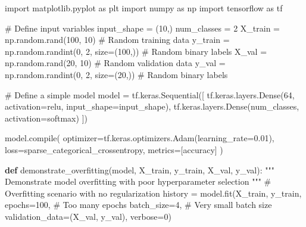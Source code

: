 \documentclass[
  letterpaper,
  DIV=11,
  numbers=noendperiod]{scrreprt}
\newenvironment{Shaded}{\begin{snugshade}}{\end{snugshade}}
\newcommand{\BuiltInTok}[1]{\textcolor[rgb]{0.00,0.23,0.31}{#1}}
\newcommand{\CommentTok}[1]{\textcolor[rgb]{0.37,0.37,0.37}{#1}}
\newcommand{\DecValTok}[1]{\textcolor[rgb]{0.68,0.00,0.00}{#1}}
\newcommand{\FloatTok}[1]{\textcolor[rgb]{0.68,0.00,0.00}{#1}}
\newcommand{\ImportTok}[1]{\textcolor[rgb]{0.00,0.46,0.62}{#1}}
\newcommand{\KeywordTok}[1]{\textcolor[rgb]{0.00,0.23,0.31}{\textbf{#1}}}
\newcommand{\NormalTok}[1]{\textcolor[rgb]{0.00,0.23,0.31}{#1}}
\newcommand{\OperatorTok}[1]{\textcolor[rgb]{0.37,0.37,0.37}{#1}}
\newcommand{\StringTok}[1]{\textcolor[rgb]{0.13,0.47,0.30}{#1}}
\begin{document}
\begin{Shaded}
\begin{Highlighting}[]
\ImportTok{import}\NormalTok{ matplotlib.pyplot }\ImportTok{as}\NormalTok{ plt}
\ImportTok{import}\NormalTok{ numpy }\ImportTok{as}\NormalTok{ np}
\ImportTok{import}\NormalTok{ tensorflow }\ImportTok{as}\NormalTok{ tf}

\CommentTok{\# Define input variables}
\NormalTok{input\_shape }\OperatorTok{=}\NormalTok{ (}\DecValTok{10}\NormalTok{,)}
\NormalTok{num\_classes }\OperatorTok{=} \DecValTok{2}
\NormalTok{X\_train }\OperatorTok{=}\NormalTok{ np.random.rand(}\DecValTok{100}\NormalTok{, }\DecValTok{10}\NormalTok{)  }\CommentTok{\# Random training data}
\NormalTok{y\_train }\OperatorTok{=}\NormalTok{ np.random.randint(}\DecValTok{0}\NormalTok{, }\DecValTok{2}\NormalTok{, size}\OperatorTok{=}\NormalTok{(}\DecValTok{100}\NormalTok{,))  }\CommentTok{\# Random binary labels}
\NormalTok{X\_val }\OperatorTok{=}\NormalTok{ np.random.rand(}\DecValTok{20}\NormalTok{, }\DecValTok{10}\NormalTok{)  }\CommentTok{\# Random validation data}
\NormalTok{y\_val }\OperatorTok{=}\NormalTok{ np.random.randint(}\DecValTok{0}\NormalTok{, }\DecValTok{2}\NormalTok{, size}\OperatorTok{=}\NormalTok{(}\DecValTok{20}\NormalTok{,))  }\CommentTok{\# Random binary labels}

\CommentTok{\# Define a simple model}
\NormalTok{model }\OperatorTok{=}\NormalTok{ tf.keras.Sequential([}
\NormalTok{    tf.keras.layers.Dense(}\DecValTok{64}\NormalTok{, activation}\OperatorTok{=}\StringTok{\textquotesingle{}relu\textquotesingle{}}\NormalTok{, input\_shape}\OperatorTok{=}\NormalTok{input\_shape),}
\NormalTok{    tf.keras.layers.Dense(num\_classes, activation}\OperatorTok{=}\StringTok{\textquotesingle{}softmax\textquotesingle{}}\NormalTok{)}
\NormalTok{])}

\NormalTok{model.}\BuiltInTok{compile}\NormalTok{(}
\NormalTok{    optimizer}\OperatorTok{=}\NormalTok{tf.keras.optimizers.Adam(learning\_rate}\OperatorTok{=}\FloatTok{0.01}\NormalTok{),}
\NormalTok{    loss}\OperatorTok{=}\StringTok{\textquotesingle{}sparse\_categorical\_crossentropy\textquotesingle{}}\NormalTok{,}
\NormalTok{    metrics}\OperatorTok{=}\NormalTok{[}\StringTok{\textquotesingle{}accuracy\textquotesingle{}}\NormalTok{]}
\NormalTok{)}

\KeywordTok{def}\NormalTok{ demonstrate\_overfitting(model, X\_train, y\_train, X\_val, y\_val):}
    \CommentTok{"""}
\CommentTok{    Demonstrate model overfitting with poor hyperparameter selection}
\CommentTok{    """}
    \CommentTok{\# Overfitting scenario with no regularization}
\NormalTok{    history }\OperatorTok{=}\NormalTok{ model.fit(X\_train, y\_train, }
\NormalTok{                        epochs}\OperatorTok{=}\DecValTok{100}\NormalTok{,  }\CommentTok{\# Too many epochs}
\NormalTok{                        batch\_size}\OperatorTok{=}\DecValTok{4}\NormalTok{,  }\CommentTok{\# Very small batch size}
\NormalTok{                        validation\_data}\OperatorTok{=}\NormalTok{(X\_val, y\_val),}
\NormalTok{                        verbose}\OperatorTok{=}\DecValTok{0}\NormalTok{)}
    

\end{Highlighting}
\end{Shaded}
\end{document}
